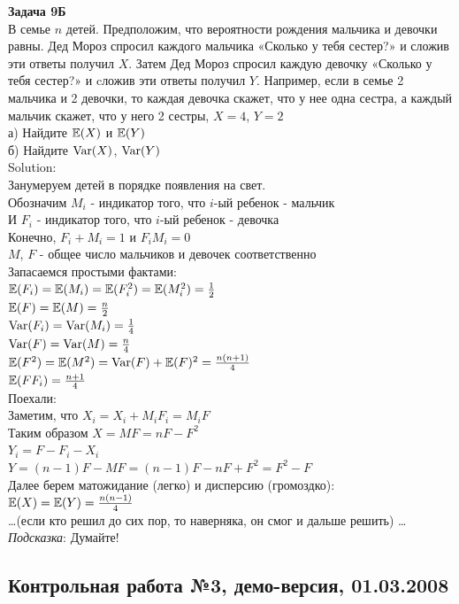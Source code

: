 \documentclass[12pt, a4paper]{article}\usepackage[]{graphicx}\usepackage[]{color}
\begin{document}
\textbf{Задача 9Б} \\
В семье $n$ детей. Предположим, что вероятности рождения мальчика и девочки равны. Дед Мороз спросил каждого мальчика «Сколько у тебя сестер?» и сложив эти ответы получил $X$. Затем Дед Мороз спросил каждую девочку «Сколько у тебя сестер?» и cложив эти ответы получил $Y$. Например, если в семье 2 мальчика и 2 девочки, то каждая девочка скажет, что у нее одна сестра, а каждый мальчик скажет, что у него 2 сестры, $X=4$, $Y=2$ \\
а) Найдите $\mathbb{E}(X)$ и $\mathbb{E}(Y)$ \\
б) Найдите $\operatorname{Var}(X)$, $\operatorname{Var}(Y)$ \\
Solution: \\
Занумеруем детей в порядке появления на свет. \\
Обозначим $M_{i}$ - индикатор того, что $i$-ый ребенок - мальчик \\
И $F_{i}$ - индикатор того, что $i$-ый ребенок - девочка \\
Конечно, $F_{i}+M_{i}=1$ и $F_{i}M_{i}=0$ \\
$M$, $F$ - общее число мальчиков и девочек соответственно \\
Запасаемся простыми фактами: \\
$\mathbb{E}(F_{i})=\mathbb{E}(M_{i})=\mathbb{E}(F_{i}^{2})=\mathbb{E}(M_{i}^{2})=\frac{1}{2}$ \\
$\mathbb{E}(F)=\mathbb{E}(M)=\frac{n}{2}$ \\
$\operatorname{Var}(F_{i})=\operatorname{Var}(M_{i})=\frac{1}{4}$ \\
$\operatorname{Var}(F)=\operatorname{Var}(M)=\frac{n}{4}$ \\
$\mathbb{E}(F^{2})=\mathbb{E}(M^{2})=\operatorname{Var}(F)+\mathbb{E}(F)^{2}=\frac{n(n+1)}{4}$ \\
$\mathbb{E}(FF_{i})=\frac{n+1}{4}$ \\
Поехали: \\
Заметим, что $X_{i}=X_{i}+M_{i}F_{i}=M_{i}F$ \\
Таким образом $X=MF=nF-F^{2}$ \\
$Y_{i}=F-F_{i}-X_{i}$ \\
$Y=(n-1)F-MF=(n-1)F-nF+F^{2}=F^{2}-F$ \\
Далее берем матожидание (легко) и дисперсию (громоздко): \\
$\mathbb{E}(X)=\mathbb{E}(Y)=\frac{n(n-1)}{4}$ \\
\ldots (если кто решил до сих пор, то наверняка, он смог и дальше решить) \ldots\\


\emph{Подсказка}: Думайте! \\


\subsection{Контрольная работа №3, демо-версия, 01.03.2008}
\end{document}
